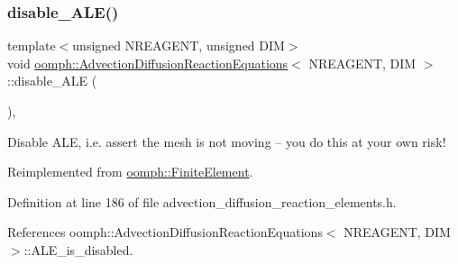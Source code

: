 \subsubsection{\texorpdfstring{disable\+\_\+\+A\+L\+E()}{disable\_ALE()}}
{\footnotesize\ttfamily template$<$unsigned N\+R\+E\+A\+G\+E\+NT, unsigned D\+IM$>$ \\
void \hyperlink{classoomph_1_1AdvectionDiffusionReactionEquations}{oomph\+::\+Advection\+Diffusion\+Reaction\+Equations}$<$ N\+R\+E\+A\+G\+E\+NT, D\+IM $>$\+::disable\+\_\+\+A\+LE (\begin{DoxyParamCaption}{ }\end{DoxyParamCaption})\hspace{0.3cm}{\ttfamily [inline]}, {\ttfamily [virtual]}}



Disable A\+LE, i.\+e. assert the mesh is not moving -- you do this at your own risk! 



Reimplemented from \hyperlink{classoomph_1_1FiniteElement_a625ea6d3f9baccfbdd1323315fb3ec71}{oomph\+::\+Finite\+Element}.



Definition at line 186 of file advection\+\_\+diffusion\+\_\+reaction\+\_\+elements.\+h.



References oomph\+::\+Advection\+Diffusion\+Reaction\+Equations$<$ N\+R\+E\+A\+G\+E\+N\+T, D\+I\+M $>$\+::\+A\+L\+E\+\_\+is\+\_\+disabled.

\mbox{\label{classoomph_1_1AdvectionDiffusionReactionEquations_a227bda2d1384aaa46dff37ccd370e6d6}} 
